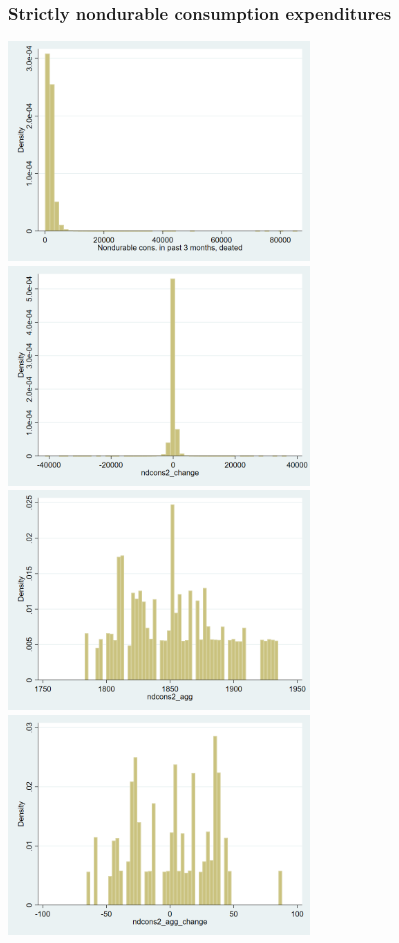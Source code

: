 \documentclass[12pt,a4paper]{article}
\begin{document}
\subsubsection*{Strictly nondurable consumption expenditures}
\begin{center}
\includegraphics[width=8cm]{ndcons2.png}
\includegraphics[width=8cm]{ndcons2_change.png}\\
\includegraphics[width=8cm]{ndcons2_agg.png}
\includegraphics[width=8cm]{ndcons2_agg_change.png}\\

\end{center}
\end{document}

